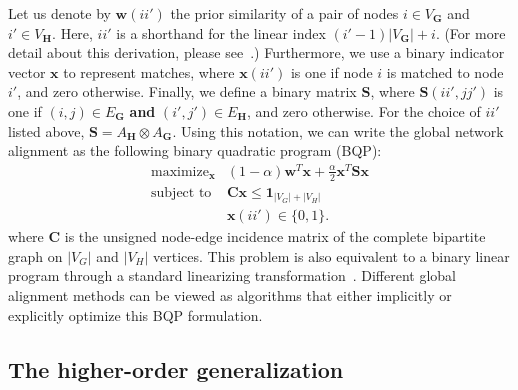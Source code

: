 \documentclass[10pt, journal, compsoc, final]{IEEEtran}
\newcommand{\bs}[1]{\boldsymbol{#1}}
\newcommand{\Vector}[1]{\bs{#1}}
\newcommand{\Matrix}[1]{\mathbf{#1}}
\newcommand{\Graph}[1]{\mathit{\mathbf{\bs{#1}}}}
\newcommand{\Set}[1]{\mathit{#1}}
\begin{document}
Let us denote by $\Vector{w}(ii')$ the prior similarity of a pair of nodes $i \in \Set{V}_\Graph{G}$ and $i' \in \Set{V}_\Graph{H}$. Here, $ii'$ is a shorthand for the linear index $(i' - 1)|\Set{V}_\Graph{G}| + i$. (For more detail about this derivation, please see~\cite{BP}.) Furthermore, we use a binary indicator vector $\Vector{x}$ to represent matches, where $\Vector{x}(ii')$ is one if node $i$ is matched to node $i'$, and zero otherwise. Finally, we define a binary matrix $\Matrix{S}$, where $\Matrix{S}(ii', jj')$ is one if $(i, j)  \in \Set{E}_\Graph{G}$ \textbf{and} $(i', j') \in \Set{E}_{\Graph{H}}$, and zero otherwise. For the choice of $ii'$ listed above, $\Matrix{S} = A_{\Graph{H}} \otimes A_{\Graph{G}}$. Using this notation, we can write the global network alignment as the following binary quadratic program (BQP):
\begin{equation}
 \begin{array}{ll}
  \displaystyle \mathop{\text{maximize}}_{\Vector{x}} & \displaystyle (1-\alpha) \Vector{w}^T \Vector{x} + \frac{\alpha}{2} \Vector{x}^T \Matrix{S} \Vector{x} \\
 \text{subject to} & \Matrix{C} \Vector{x} \le \Vector{1}_{|V_G|+|V_H|} \\
  & \Vector{x}(ii') \in \{0, 1\}.
 \end{array}
 \label{eq:IQP}
\end{equation}
where $\Matrix{C}$ is the unsigned node-edge incidence matrix of the complete bipartite
graph on $|V_G|$ and $|V_H|$ vertices. This problem is also equivalent to a binary linear program through a standard linearizing transformation~\cite{Natalie1,BP}. Different global alignment methods can be viewed as algorithms that either implicitly or explicitly 
optimize this BQP formulation.























\subsection{The higher-order generalization}
\end{document}
